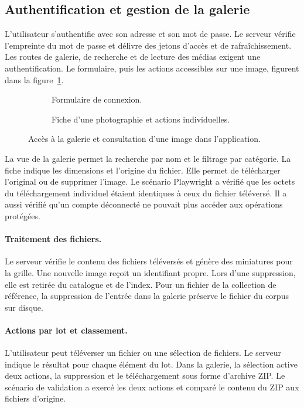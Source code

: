 \clearpage
\subsection{Authentification et gestion de la galerie}
L'utilisateur s'authentifie avec son adresse et son mot de passe. Le serveur vérifie l'empreinte du mot de passe et délivre des jetons d'accès et de rafraîchissement. Les routes de galerie, de recherche et de lecture des médias exigent une authentification. Le formulaire, puis les actions accessibles sur une image, figurent dans la figure~\ref{fig:connexion-fiche}.

\begin{figure}[ht]
  \centering
  \begin{subfigure}[t]{0.33\linewidth}
    \centering
    \caption{Formulaire de connexion.}
  \end{subfigure}\hfill
  \begin{subfigure}[t]{0.64\linewidth}
    \centering
    \caption{Fiche d'une photographie et actions individuelles.}
  \end{subfigure}
  \caption{Accès à la galerie et consultation d'une image dans l'application.}
  \label{fig:connexion-fiche}
\end{figure}

La vue de la galerie permet la recherche par nom et le filtrage par catégorie. La fiche indique les dimensions et l'origine du fichier. Elle permet de télécharger l'original ou de supprimer l'image. Le scénario Playwright a vérifié que les octets du téléchargement individuel étaient identiques à ceux du fichier téléversé. Il a aussi vérifié qu'un compte déconnecté ne pouvait plus accéder aux opérations protégées.

\paragraph{Traitement des fichiers.}
Le serveur vérifie le contenu des fichiers téléversés et génère des miniatures pour la grille. Une nouvelle image reçoit un identifiant propre. Lors d'une suppression, elle est retirée du catalogue et de l'index. Pour un fichier de la collection de référence, la suppression de l'entrée dans la galerie préserve le fichier du corpus sur disque.

\clearpage
\paragraph{Actions par lot et classement.}
L'utilisateur peut téléverser un fichier ou une sélection de fichiers. Le serveur indique le résultat pour chaque élément du lot. Dans la galerie, la sélection active deux actions, la suppression et le téléchargement sous forme d'archive ZIP. Le scénario de validation a exercé les deux actions et comparé le contenu du ZIP aux fichiers d'origine.

